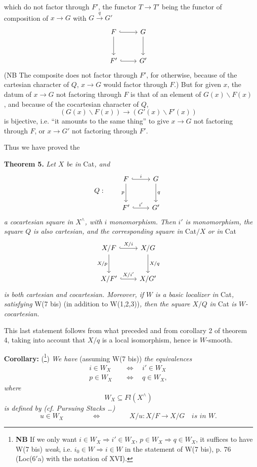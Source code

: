 which do not factor through $F'$, the functor $T \longrightarrow T'$ being the functor of composition of $x \longrightarrow G$ with $G \xrightarrow{q} G'$
\[
\begin{tikzcd}[row sep=large]
F \arrow[r, hook] \arrow[d] & G \arrow[d] \\
F' \arrow[r, hook] & G'
\end{tikzcd}
\]
(NB The composite does not factor through $F'$, for otherwise, because of the cartesian character of $Q$, $x \longrightarrow G$ would factor through $F$.) But for given $x$, the datum of $x \longrightarrow G$ not factoring through $F$ is that of an element  of $G(x)\backslash F(x)$, and because of the cocartesian character of $Q$,
\[
(G(x)\backslash F(x)) \longrightarrow (G'(x)\backslash F'(x))
\]
is bijective, i.e. ``it amounts to the same thing'' to give $x \longrightarrow G$ not factoring through $F$, or $x \longrightarrow G'$ not factoring through $F'$.

Thus we have proved the

\textbf{Theorem 5.} \textit{Let $X$ be in} Cat\textit{, and}
\[
Q : \qquad
\begin{tikzcd}[row sep=large, baseline=(current bounding box.center)]
F \arrow[r, hook, "i"] \arrow[d, "p"'] & G \arrow[d, "q"] \\
F' \arrow[r, hook, "i'"] & G'
\end{tikzcd}
\]
\textit{a cocartesian square in $X^\wedge$, with $i$} \textit{monomorphism. Then $i'$ is} \textit{monomorphism, the square $Q$ is also cartesian, and the corresponding square in} Cat$/X$ \textit{or in} Cat
\[
\begin{tikzcd}[row sep=large]
X/F \arrow[r, hook, "X/i"] \arrow[d, "X/p"'] & X/G \arrow[d, "X/q"] \\
X/F' \arrow[r, hook, "X/i'"] & X/G'
\end{tikzcd}
\]
 \textit{is both cartesian and cocartesian. Moreover, if $W$ is a basic localizer in} Cat\textit{, satisfying} W(7 bis) (in addition to W(1,2,3))\textit{, then the square $X/Q$ in} Cat \textit{is $W$-cocartesian.}

This last statement follows from what preceded and from corollary 2 of theorem 4, taking into account that $X/q$ is a local isomorphism, hence is $W$-smooth.

\textbf{Corollary:} (\footnote[111]{\textbf{NB} If we only want $i \in W_X \Longrightarrow i' \in W_X$, $p \in W_X \Longrightarrow q \in W_X$, it suffices to have W(7 bis) \textit{weak}, i.e. $i_0 \in W \Longrightarrow i \in W$ in the statement of W(7 bis), p. 76 (Loc(6$'$a) with the notation of XVI).}) \textit{We have} (assuming W(7 bis)) \textit{the equivalences}
\[
\begin{aligned}
i \in W_X \quad &\Longleftrightarrow \quad i' \in W_X \\
p \in W_X \quad &\Longleftrightarrow \quad q \in W_X,
\end{aligned}
\]
\textit{where}
\[
W_X \subseteq \mathit{Fl}(X^\wedge)
\]
\textit{is defined by (cf. Pursuing Stacks \ldots)}
\[
u \in W_X \qquad\qquad \Longleftrightarrow \qquad\qquad X/u : X/F \longrightarrow X/G \quad \textit{is in } W.
\]

